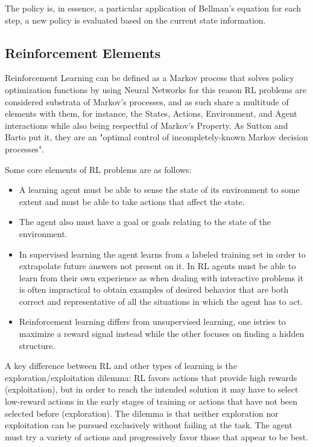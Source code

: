 The policy is, in essence, a particular application of Bellman's equation for each step, a new policy is evaluated based on the current state information.

\subsection*{Reinforcement Elements}

Reinforcement Learning can be defined as a Markov process that solves policy optimization functions by using Neural Networks for this reason RL problems are considered substrata of Markov's processes, and as such share a multitude of elements with them, for instance, the States, Actions, Environment, and Agent interactions while also being respectful of Markov's Property. As Sutton and Barto put it, they are an "optimal control of incompletely-known Markov decision processes\cite{sutton2018reinforcement}".

Some core elements of RL problems are as follows:

\begin{itemize}
    \item A learning agent must be able to sense the state of its environment to some extent and must be able to take actions that affect the state.
    \item The agent also must have a goal or goals relating to the state of the environment.
    \item In supervised learning the agent learns from a labeled training set in order to extrapolate future answers not present on it. In RL agents must be able to learn from their own experience as when dealing with interactive problems it is often impractical to obtain examples of desired behavior that are both correct and representative of all the situations in which the agent has to act.
    \item Reinforcement learning differs from unsupervised learning, one istries to maximize a reward signal instead while the other focuses on finding a hidden structure.
\end{itemize}

A key difference between RL and other types of learning is the exploration/exploitation dilemma: RL favors actions that provide high rewards (exploitation), but in order to reach the intended solution it may have to select low-reward actions in the early stages of training or actions that have not been selected before (exploration). The dilemma is that neither exploration nor exploitation can be pursued exclusively without failing at the task. The agent must try a variety of actions and progressively favor those that appear to be best.

